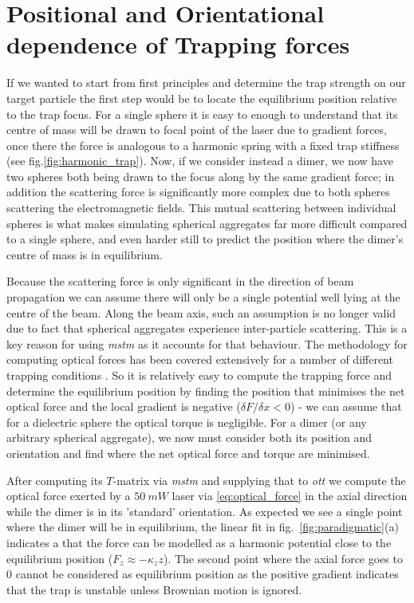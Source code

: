 \section{Positional and Orientational dependence of Trapping forces}
\label{sec:eq_positions}
If we wanted to start from first principles and determine 
the trap strength on our target particle the first step 
would be to locate the equilibrium position relative to 
the trap focus. For a single sphere it is easy to enough 
to understand that its centre of mass will be drawn to 
focal point of the laser due to gradient forces, once there 
the force is analogous to a harmonic spring with a fixed 
trap stiffness (see fig.\ref{fig:harmonic_trap}). Now, if 
we consider instead a dimer, we now have two spheres both 
being drawn to the focus along by the same gradient force; 
in addition the scattering force is significantly more complex 
due to both spheres scattering the electromagnetic fields. 
This mutual scattering between individual spheres is what 
makes simulating spherical aggregates far more difficult 
compared to a single sphere, and even harder still to 
predict the position where the dimer's centre of mass is 
in equilibrium.

Because the scattering force is only significant in the 
direction of beam propagation \cite{Capitanio2002} we 
can assume there will only be a single potential well 
lying at the centre of the beam. Along the beam axis, 
such an assumption is no longer valid due to fact that 
spherical aggregates experience inter-particle scattering. 
This is a key reason for using \textit{mstm} as it 
accounts for that behaviour. The methodology for computing 
optical forces has been covered extensively for a number 
of different trapping conditions \cite{RanhaNeves2019}. 
So it is relatively easy to compute the trapping force 
and determine the equilibrium position by finding the 
position that minimises the net optical force and the 
local gradient is negative ($\delta F/\delta x < 0$) - 
we can assume that for a dielectric sphere the optical 
torque is negligible. For a dimer (or any arbitrary 
spherical aggregate), we now must consider both its 
position and orientation and find where the net optical 
force and torque are minimised. 

After computing its $T$-matrix via \textit{mstm} and 
supplying that to \textit{ott} we compute the optical 
force exerted by a $50\ mW$ laser via \eqref{eq:optical_force} 
in the axial direction while the dimer is in its 'standard' 
orientation. As expected we see a single point where 
the dimer will be in equilibrium, the linear fit in 
fig.~\ref{fig:paradigmatic}(a) indicates a that the 
force can be modelled as a harmonic potential close to 
the equilibrium position ($F_z\approx-\kappa_z z$). 
The second point where the axial force goes to 0 cannot 
be considered as equilibrium position as the positive 
gradient indicates that the trap is unstable unless 
Brownian motion is ignored. 

